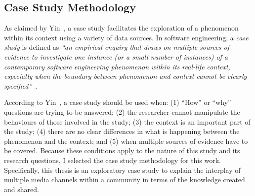 \documentclass{sig-alternate-05-2015}
\begin{document}



\subsection{Case Study Methodology}

	As claimed by Yin~\cite{Yin2009,Yin2012}, a case study facilitates the exploration of a phenomenon within its context using a variety of data sources.
	In software engineering, a \textit{case study} is defined as  \textit{``an empirical enquiry that draws on multiple sources of evidence to investigate one instance (or a small number of instances) of a contemporary software engineering phenomenon within its real-life context, especially when the boundary between phenomenon and context cannot be clearly specified''}~\cite{Runeson2012}.

	According to Yin~\cite{Yin2012}, a case study should be used when: 
	(1) ``How'' or ``why'' questions are trying to be answered; 
	(2) the researcher cannot manipulate the behaviours of those involved in the study; 
	(3) the context is an important part of the study; 
	(4) there are no clear differences in what is happening between the phenomenon and the context; 
	and (5) when multiple sources of evidence have to be covered. 
	Because these conditions apply to the nature of this study and its research questions, I selected the case study methodology for this work. 
	Specifically, this thesis is an exploratory case study to explain the interplay of multiple media channels within a community in terms of the knowledge created and shared.
\end{document}
